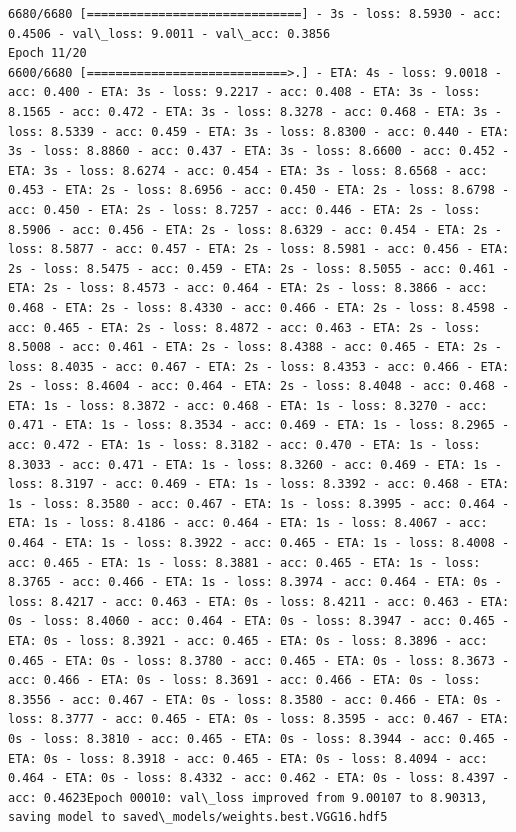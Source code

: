 \documentclass[11pt]{article}
\begin{document}
\begin{Verbatim}[commandchars=\\\{\}]
6680/6680 [==============================] - 3s - loss: 8.5930 - acc: 0.4506 - val\_loss: 9.0011 - val\_acc: 0.3856
Epoch 11/20
6600/6680 [============================>.] - ETA: 4s - loss: 9.0018 - acc: 0.400 - ETA: 3s - loss: 9.2217 - acc: 0.408 - ETA: 3s - loss: 8.1565 - acc: 0.472 - ETA: 3s - loss: 8.3278 - acc: 0.468 - ETA: 3s - loss: 8.5339 - acc: 0.459 - ETA: 3s - loss: 8.8300 - acc: 0.440 - ETA: 3s - loss: 8.8860 - acc: 0.437 - ETA: 3s - loss: 8.6600 - acc: 0.452 - ETA: 3s - loss: 8.6274 - acc: 0.454 - ETA: 3s - loss: 8.6568 - acc: 0.453 - ETA: 2s - loss: 8.6956 - acc: 0.450 - ETA: 2s - loss: 8.6798 - acc: 0.450 - ETA: 2s - loss: 8.7257 - acc: 0.446 - ETA: 2s - loss: 8.5906 - acc: 0.456 - ETA: 2s - loss: 8.6329 - acc: 0.454 - ETA: 2s - loss: 8.5877 - acc: 0.457 - ETA: 2s - loss: 8.5981 - acc: 0.456 - ETA: 2s - loss: 8.5475 - acc: 0.459 - ETA: 2s - loss: 8.5055 - acc: 0.461 - ETA: 2s - loss: 8.4573 - acc: 0.464 - ETA: 2s - loss: 8.3866 - acc: 0.468 - ETA: 2s - loss: 8.4330 - acc: 0.466 - ETA: 2s - loss: 8.4598 - acc: 0.465 - ETA: 2s - loss: 8.4872 - acc: 0.463 - ETA: 2s - loss: 8.5008 - acc: 0.461 - ETA: 2s - loss: 8.4388 - acc: 0.465 - ETA: 2s - loss: 8.4035 - acc: 0.467 - ETA: 2s - loss: 8.4353 - acc: 0.466 - ETA: 2s - loss: 8.4604 - acc: 0.464 - ETA: 2s - loss: 8.4048 - acc: 0.468 - ETA: 1s - loss: 8.3872 - acc: 0.468 - ETA: 1s - loss: 8.3270 - acc: 0.471 - ETA: 1s - loss: 8.3534 - acc: 0.469 - ETA: 1s - loss: 8.2965 - acc: 0.472 - ETA: 1s - loss: 8.3182 - acc: 0.470 - ETA: 1s - loss: 8.3033 - acc: 0.471 - ETA: 1s - loss: 8.3260 - acc: 0.469 - ETA: 1s - loss: 8.3197 - acc: 0.469 - ETA: 1s - loss: 8.3392 - acc: 0.468 - ETA: 1s - loss: 8.3580 - acc: 0.467 - ETA: 1s - loss: 8.3995 - acc: 0.464 - ETA: 1s - loss: 8.4186 - acc: 0.464 - ETA: 1s - loss: 8.4067 - acc: 0.464 - ETA: 1s - loss: 8.3922 - acc: 0.465 - ETA: 1s - loss: 8.4008 - acc: 0.465 - ETA: 1s - loss: 8.3881 - acc: 0.465 - ETA: 1s - loss: 8.3765 - acc: 0.466 - ETA: 1s - loss: 8.3974 - acc: 0.464 - ETA: 0s - loss: 8.4217 - acc: 0.463 - ETA: 0s - loss: 8.4211 - acc: 0.463 - ETA: 0s - loss: 8.4060 - acc: 0.464 - ETA: 0s - loss: 8.3947 - acc: 0.465 - ETA: 0s - loss: 8.3921 - acc: 0.465 - ETA: 0s - loss: 8.3896 - acc: 0.465 - ETA: 0s - loss: 8.3780 - acc: 0.465 - ETA: 0s - loss: 8.3673 - acc: 0.466 - ETA: 0s - loss: 8.3691 - acc: 0.466 - ETA: 0s - loss: 8.3556 - acc: 0.467 - ETA: 0s - loss: 8.3580 - acc: 0.466 - ETA: 0s - loss: 8.3777 - acc: 0.465 - ETA: 0s - loss: 8.3595 - acc: 0.467 - ETA: 0s - loss: 8.3810 - acc: 0.465 - ETA: 0s - loss: 8.3944 - acc: 0.465 - ETA: 0s - loss: 8.3918 - acc: 0.465 - ETA: 0s - loss: 8.4094 - acc: 0.464 - ETA: 0s - loss: 8.4332 - acc: 0.462 - ETA: 0s - loss: 8.4397 - acc: 0.4623Epoch 00010: val\_loss improved from 9.00107 to 8.90313, saving model to saved\_models/weights.best.VGG16.hdf5

\end{Verbatim}
\end{document}
